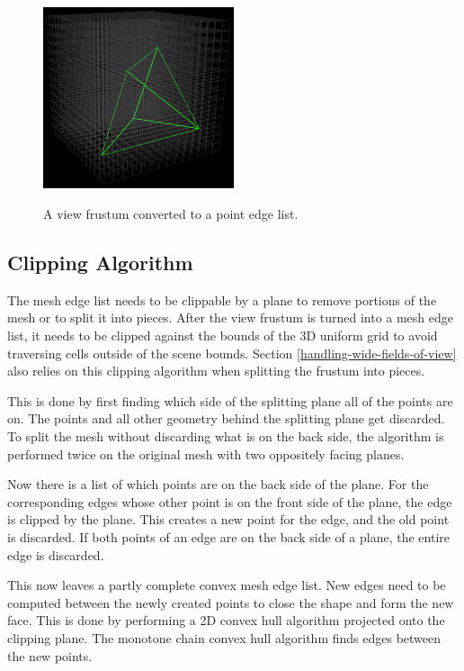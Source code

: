 \documentclass[12pt]{ucthesis}
\newcommand{\captionfonts}{\small\bf\ssp}
\begin{document}
\begin{figure}
\begin{center}
\includegraphics[width=0.5\textwidth]{Images/RasterizingAlgorithm/Final/Frust.png}
\captionfonts
\caption[Point Edge List]{A view frustum converted to a point edge list.}
\label{fig:point-edge-list}
\end{center}
\end{figure}

\subsection{Clipping Algorithm}
\label{clipping-algorithm}

The mesh edge list needs to be clippable by a plane to remove portions of the mesh or to split it into pieces.
After the view frustum is turned into a mesh edge list, it needs to be clipped against the bounds of the 3D uniform grid to avoid traversing cells outside of the scene bounds.
Section \ref{handling-wide-fields-of-view} also relies on this clipping algorithm when splitting the frustum into pieces.

This is done by first finding which side of the splitting plane all of the points are on.
The points and all other geometry behind the splitting plane get discarded.
To split the mesh without discarding what is on the back side, the algorithm is performed twice on the original mesh with two oppositely facing planes.

Now there is a list of which points are on the back side of the plane.
For the corresponding edges whose other point is on the front side of the plane, the edge is clipped by the plane.
This creates a new point for the edge, and the old point is discarded.
If both points of an edge are on the back side of a plane, the entire edge is discarded.

This now leaves a partly complete convex mesh edge list.
New edges need to be computed between the newly created points to close the shape and form the new face.
This is done by performing a 2D convex hull algorithm projected onto the clipping plane.
The monotone chain convex hull algorithm finds edges between the new points.\cite{monotone-chain}
\end{document}
